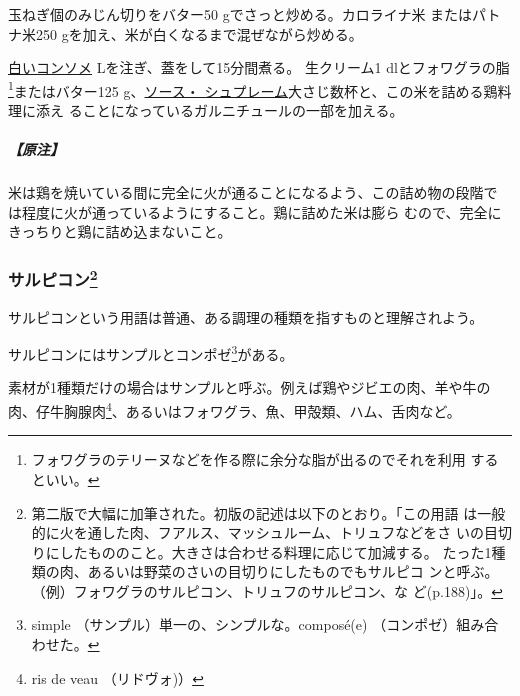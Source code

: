 \begin{recette}
玉ねぎ\undemi{}個のみじん切りをバター50 gでさっと炒める。カロライナ米
またはパトナ米250 gを加え、米が白くなるまで混ぜながら炒める。

\protect\hyperlink{consomme-blanc}{白いコンソメ}\undemi{}
Lを注ぎ、蓋をして15分間煮る。 生クリーム1\undemi{}
dlとフォワグラの脂\footnote{フォワグラのテリーヌなどを作る際に余分な脂が出るのでそれを利用
  するといい。}またはバター125
g、\protect\hyperlink{sauce-supreme}{ソース・
シュプレーム}大さじ数杯と、この米を詰める鶏料理に添え
ることになっているガルニチュールの一部を加える。

\hypertarget{ux539fux6ce8-2}{%
\subparagraph{【原注】}\label{ux539fux6ce8-2}}

米は鶏を焼いている間に完全に火が通ることになるよう、この詰め物の段階で
は\troisquarts{}程度に火が通っているようにすること。鶏に詰めた米は膨ら
むので、完全にきっちりと鶏に詰め込まないこと。

\maeaki

\hypertarget{salpicons-divers}{%
\subsubsection[サルピコン]{\texorpdfstring{サルピコン\footnote{第二版で大幅に加筆された。初版の記述は以下のとおり。「この用語
  は一般的に火を通した肉、フアルス、マッシュルーム、トリュフなどをさ
  いの目切りにしたもののこと。大きさは合わせる料理に応じて加減する。
  たった1種類の肉、あるいは野菜のさいの目切りにしたものでもサルピコ
  ンと呼ぶ。（例）フォワグラのサルピコン、トリュフのサルピコン、な
  ど(p.188)」。}}{サルピコン}}\label{salpicons-divers}}



サルピコンという用語は普通、ある調理の種類を指すものと理解されよう。

サルピコンにはサンプルとコンポゼ\footnote{simple
  （サンプル）単一の、シンプルな。composé(e) （コンポゼ）組み合わせた。}がある。

素材が1種類だけの場合はサンプルと呼ぶ。例えば鶏やジビエの肉、羊や牛の
肉、仔牛胸腺肉\footnote{ris de veau （リドヴォ)）}、あるいはフォワグラ、魚、甲殻類、ハム、舌肉など。


\end{recette}

